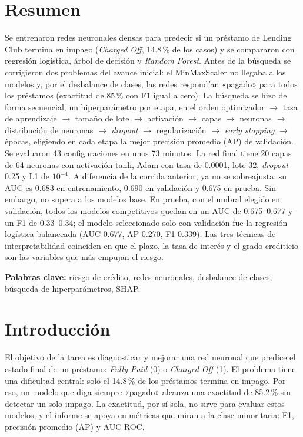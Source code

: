 \documentclass[12pt,a4paper]{article}
\begin{document}
\section*{Resumen}
\noindent Se entrenaron redes neuronales densas para predecir si un préstamo de Lending Club termina en impago (\textit{Charged Off}, 14.8\,\% de los casos) y se compararon con regresión logística, árbol de decisión y \textit{Random Forest}. Antes de la búsqueda se corrigieron dos problemas del avance inicial: el MinMaxScaler no llegaba a los modelos y, por el desbalance de clases, las redes respondían «pagado» para todos los préstamos (exactitud de 85\,\% con F1 igual a cero). La búsqueda se hizo de forma secuencial, un hiperparámetro por etapa, en el orden optimizador $\rightarrow$ tasa de aprendizaje $\rightarrow$ tamaño de lote $\rightarrow$ activación $\rightarrow$ capas $\rightarrow$ neuronas $\rightarrow$ distribución de neuronas $\rightarrow$ \textit{dropout} $\rightarrow$ regularización $\rightarrow$ \textit{early stopping} $\rightarrow$ épocas, eligiendo en cada etapa la mejor precisión promedio (AP) de validación. Se evaluaron 43 configuraciones en unos 73 minutos. La red final tiene 20 capas de 64 neuronas con activación tanh, Adam con tasa de 0.0001, lote 32, \textit{dropout} 0.25 y L1 de $10^{-4}$. A diferencia de la corrida anterior, ya no se sobreajusta: su AUC es 0.683 en entrenamiento, 0.690 en validación y 0.675 en prueba. Sin embargo, no supera a los modelos base. En prueba, con el umbral elegido en validación, todos los modelos competitivos quedan en un AUC de 0.675--0.677 y un F1 de 0.33--0.34; el modelo seleccionado solo con validación fue la regresión logística balanceada (AUC 0.677, AP 0.270, F1 0.339). Las tres técnicas de interpretabilidad coinciden en que el plazo, la tasa de interés y el grado crediticio son las variables que más empujan el riesgo.

\vspace{0.3cm}
\noindent\textbf{Palabras clave:} riesgo de crédito, redes neuronales, desbalance de clases, búsqueda de hiperparámetros, SHAP.

\newpage
\tableofcontents
\newpage

\section{Introducción}

El objetivo de la tarea es diagnosticar y mejorar una red neuronal que predice el estado final de un préstamo: \textit{Fully Paid} (0) o \textit{Charged Off} (1). El problema tiene una dificultad central: solo el 14.8\,\% de los préstamos termina en impago. Por eso, un modelo que diga siempre «pagado» alcanza una exactitud de 85.2\,\% sin detectar un solo impago. La exactitud, por sí sola, no sirve para evaluar estos modelos, y el informe se apoya en métricas que miran a la clase minoritaria: F1, precisión promedio (AP) y AUC ROC.
\end{document}
